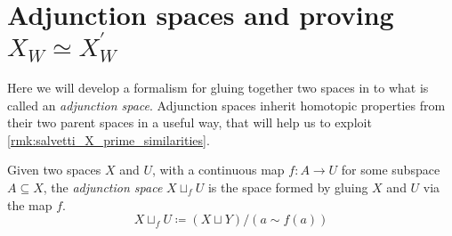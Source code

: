 \documentclass[class=article, crop=false]{standalone}
\begin{document}
\section{Adjunction spaces and proving \texorpdfstring{$X_W \simeq X^\prime_W$}{X W homotopy equiv. to X prime W}}
\label{sec:adj_hom_equiv}

Here we will develop a formalism for gluing together two spaces in to what is called an \emph{adjunction space}. Adjunction spaces inherit homotopic properties from their two parent spaces in a useful way, that will help us to exploit \cref{rmk:salvetti_X_prime_similarities}.

\begin{definition}
    Given two spaces $X$ and $U$, with a continuous map $f \colon A \to U$ for some subspace $A \subseteq X$, the \emph{adjunction space} $ X \sqcup_f U$  is the space formed by gluing $X$ and $U$ via the map $f$.
    \begin{equation*}
        X \sqcup_f U \coloneq (X \sqcup Y)/(a \sim f(a))
    \end{equation*}
\end{definition}
\end{document}
